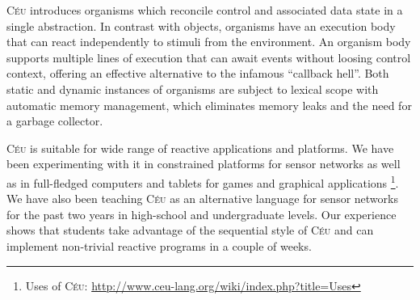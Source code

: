 \documentclass{sigplanconf}
\newcommand{\CEU}{\textsc{C\'{e}u}\xspace}
\newcommand{\1}{\;}
\newcommand{\2}{\;\;}
\newcommand{\3}{\;\;\;}
\newcommand{\5}{\;\;\;\;\;}
\newcommand{\URL}{\small\url}
\begin{document}
\CEU introduces organisms which reconcile control and associated data state in 
a single abstraction.
%
In contrast with objects, organisms have an execution body that can react 
independently to stimuli from the environment.
An organism body supports multiple lines of execution that can await events 
without loosing control context, offering an effective alternative to the 
infamous ``callback hell''.
%
Both static and dynamic instances of organisms are subject to lexical scope 
with automatic memory management, which eliminates memory leaks and the need 
for a garbage collector.

\CEU is suitable for wide range of reactive applications and platforms.
%
We have been experimenting with it in constrained platforms for sensor networks 
as well as in full-fledged computers and tablets for games and graphical 
applications%
\footnote{Uses of \CEU: 
\URL{http://www.ceu-lang.org/wiki/index.php?title=Uses}}.
%
%
We have also been teaching \CEU as an alternative language for sensor networks 
for the past two years in high-school and undergraduate levels.
%
Our experience shows that students take advantage of the sequential style of 
\CEU and can implement non-trivial reactive programs in a couple of weeks.




\end{document}
